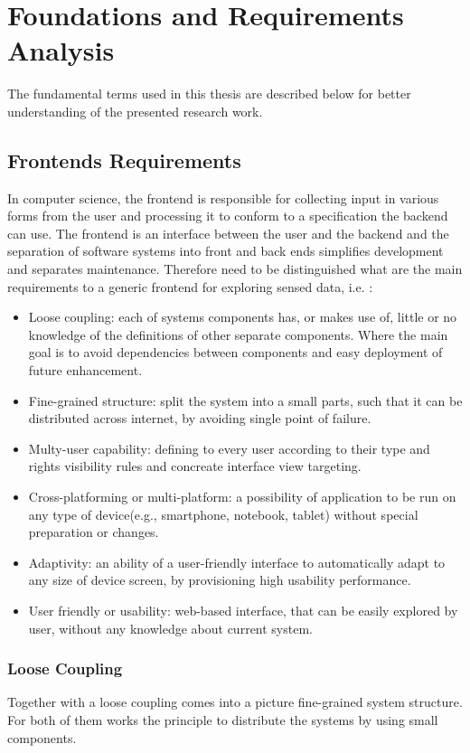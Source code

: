 \chapter{Foundations and Requirements Analysis}
The fundamental terms used in this thesis are described below for better understanding of the presented research work.

\section {Frontends Requirements}
In computer science, the frontend is responsible for collecting input in various forms from the user and processing it to conform to a specification the backend can use. The frontend is an interface between the user and the backend\cite{wiki:xxx} and the separation of software systems into front and back ends simplifies development and separates maintenance. Therefore need to be distinguished what are the main requirements to a generic frontend for exploring sensed data, i.e. :
\begin{itemize}
\item Loose coupling: each of systems components has, or makes use of, little or no knowledge of the definitions of other separate 
      components. Where the main goal is to avoid dependencies between components and easy deployment of future enhancement.
\item Fine-grained structure: split the system into a small parts, such that it can be distributed across internet, by avoiding single 
      point of failure.
\item Multy-user capability: defining to every user according to their type and rights visibility rules and concreate interface view 
      targeting.
\item Cross-platforming or multi-platform: a possibility of application to be run on any type of device(e.g., smartphone, notebook,  
      tablet) without special preparation or changes.
\item Adaptivity: an ability of a user-friendly interface to automatically adapt to any size of device screen, by provisioning high 
      usability performance.
\item User friendly or usability: web-based interface, that can be easily explored by user, without any knowledge about current system.
\end{itemize} 
\subsection {Loose Coupling}
Together with a loose coupling comes into a picture fine-grained system structure. For both of them works the principle to distribute the systems by using small components.

